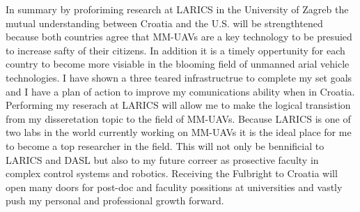 \documentclass[12pt]{article}
\begin{document}
In summary by proforiming research at LARICS in the University of Zagreb the mutual understanding between Croatia and the U.S. will be strengthtened because both countries agree that MM-UAVs are a key technology to be presuied to increase safty of their citizens.
In addition it is a timely oppertunity for each country to become more visiable in the blooming field of unmanned arial vehicle technologies.  
I have shown a three teared infrastructrue to complete my set goals and I have a plan of action to improve my comunications ability when in Croatia.
Performing my reserach at LARICS will allow me to make the logical transistion from my disseretation topic to the field of MM-UAVs.  
Because LARICS is one of two labs in the world currently working on MM-UAVs it is the ideal place for me to become  a top researcher in the field.  
This will not only be bennificial to LARICS and DASL but also to my future correer as prosective faculty in complex control systems and robotics.
Receiving the Fulbright to Croatia will open many doors for post-doc and faculity possitions at universities and vastly push my personal and professional growth forward.
\end{document}
